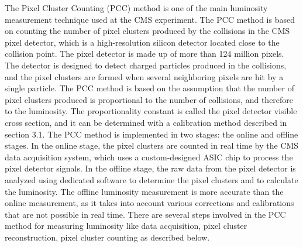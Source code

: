 The Pixel Cluster Counting (PCC) method is one of the main luminosity measurement technique used at the CMS experiment. The PCC method is based on counting the number of pixel clusters produced by the collisions in the CMS pixel detector, which is a high-resolution silicon detector located close to the collision point. The pixel detector is made up of more than 124 million pixels. The detector is designed to detect charged particles produced in the collisions, and the pixel clusters are formed when several neighboring pixels are hit by a single particle. The PCC method is based on the assumption that the number of pixel clusters produced is proportional to the number of collisions, and therefore to the luminosity. The proportionality constant is called the pixel detector visible cross section, and it can be determined with a calibration method described in section 3.1. The PCC method is implemented in two stages: the online and offline stages. In the online stage, the pixel clusters are counted in real time by the CMS data acquisition system, which uses a custom-designed ASIC chip to process the pixel detector signals. %
In the offline stage, the raw data from the pixel detector is analyzed using dedicated software to determine the pixel clusters and to calculate the luminosity. The offline luminosity measurement is more accurate than the online measurement, as it takes into account various corrections and calibrations that are not possible in real time. %
There are several steps involved in the PCC method for measuring luminosity like data acquisition, pixel cluster reconstruction, pixel cluster counting as described below.

